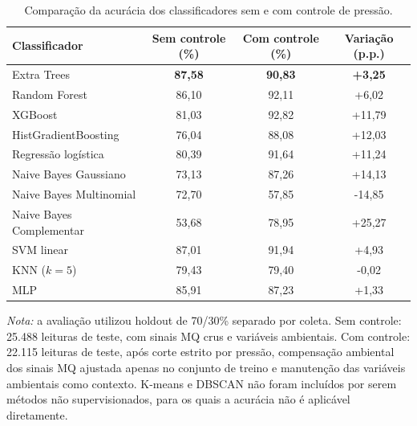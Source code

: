 \begin{table}[H]
    \centering
    \caption{Comparação da acurácia dos classificadores sem e com controle de pressão.}
    \label{tab:comparacao_modelos}
    \footnotesize
    \begin{tabular}{l c c c}
        \hline
        \textbf{Classificador} & \textbf{Sem controle (\%)} & \textbf{Com controle (\%)} & \textbf{Variação (p.p.)} \\
        \hline
        Extra Trees & \textbf{87,58} & \textbf{90,83} & \textbf{+3,25} \\
        Random Forest & 86,10 & 92,11 & +6,02 \\
        XGBoost & 81,03 & 92,82 & +11,79 \\
        HistGradientBoosting & 76,04 & 88,08 & +12,03 \\
        Regressão logística & 80,39 & 91,64 & +11,24 \\
        Naive Bayes Gaussiano & 73,13 & 87,26 & +14,13 \\
        Naive Bayes Multinomial & 72,70 & 57,85 & -14,85 \\
        Naive Bayes Complementar & 53,68 & 78,95 & +25,27 \\
        SVM linear & 87,01 & 91,94 & +4,93 \\
        KNN ($k=5$) & 79,43 & 79,40 & -0,02 \\
        MLP & 85,91 & 87,23 & +1,33 \\
        \hline
    \end{tabular}
    \vspace{0.15cm}
    \parbox{0.94\textwidth}{\footnotesize\textit{Nota:} a avaliação utilizou holdout de 70/30\% separado por coleta. Sem controle: 25.488 leituras de teste, com sinais MQ crus e variáveis ambientais. Com controle: 22.115 leituras de teste, após corte estrito por pressão, compensação ambiental dos sinais MQ ajustada apenas no conjunto de treino e manutenção das variáveis ambientais como contexto. K-means e DBSCAN não foram incluídos por serem métodos não supervisionados, para os quais a acurácia não é aplicável diretamente.}
\end{table}
